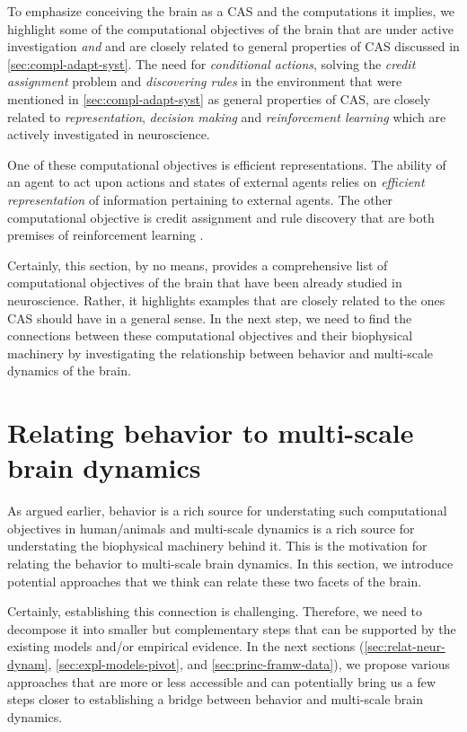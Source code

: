To emphasize conceiving the brain as a CAS and the computations it implies, 
we highlight some of the computational objectives of the brain that are under active investigation \emph{and}
and are closely related to general properties of CAS discussed in \autoref{sec:compl-adapt-syst}.
The need for \emph{conditional actions}, solving the \emph{credit assignment} problem and \emph{discovering rules} in the environment
that were mentioned in \autoref{sec:compl-adapt-syst} as general properties of CAS,
are closely related to \emph{representation}, \emph{decision making} and \emph{reinforcement learning}
which are actively investigated in neuroscience.

One of these computational objectives is efficient representations.
The ability of an agent to act upon actions and states of external agents relies on \emph{efficient representation} of information pertaining to external agents.
The other computational objective is credit assignment and rule discovery that are both premises of reinforcement learning \cite{woergoetterReinforcementLearning2008}.

Certainly, this section, by no means, provides a comprehensive list of computational objectives of the brain that have been already studied in neuroscience.
Rather, it highlights examples that are closely related to the ones CAS should have in a general sense.
In the next step, we need to find the connections between these computational objectives and their biophysical machinery by investigating the relationship between behavior and multi-scale dynamics of the brain. 

\section{Relating behavior to multi-scale brain dynamics}\label{sec:relat-behav-multi}
As argued earlier, behavior is a rich source for understating such computational objectives in human/animals and 
multi-scale dynamics is a rich source for understating the biophysical machinery behind it.
This is the motivation for relating the behavior to multi-scale brain dynamics.
In this section, we introduce potential approaches that we think can relate these two facets of the brain.

Certainly, establishing this connection is challenging.
Therefore, we need to decompose it into smaller but complementary steps that can be supported by the existing models and/or empirical evidence.
In the next sections 
(\autoref{sec:relat-neur-dynam}, \autoref{sec:expl-models-pivot}, and \autoref{sec:princ-framw-data}),
we propose various approaches that are more or less accessible and can potentially bring us a few steps closer to establishing a bridge between behavior and multi-scale brain dynamics.

